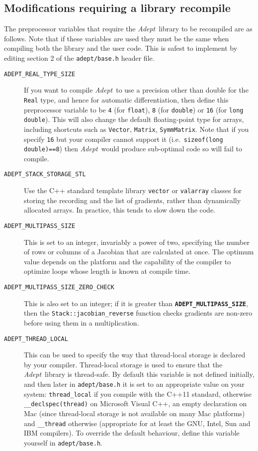 \documentclass[a4,oneside]{book}
\def\codesize{\small}
\def\Adept{\emph{Adept}}
\def\code#1{{\codesize\texttt{#1}}}
\def\codebf#1{{\codesize\texttt{\textbf{#1}}}}
\def\citem#1{\item[{\codesize\texttt{#1}}]}
\begin{document}
\subsection{Modifications requiring a library recompile}
\label{sec:configuring_lib}
\noindent The preprocessor variables that require the \Adept\ library
to be recompiled are as follows. Note that if these variables are used
they must be the same when compiling both the library and the user
code. This is safest to implement by editing section 2 of the
\code{adept/base.h} header file.
\begin{description}
\citem{ADEPT\_REAL\_TYPE\_SIZE} If you want to compile \Adept\ to use
a precision other than double for the \code{Real} type, and hence for
automatic differentiation, then define this preprocessor variable to
be \code{4} (for \code{float}), \code{8} (for \code{double}) or
\code{16} (for \code{long double}). This will also change the default
floating-point type for arrays, including shortcuts such as
\code{Vector}, \code{Matrix}, \code{SymmMatrix}. Note that if you
specify \code{16} but your compiler cannot support it
(i.e.\ \code{sizeof(long double)==8}) then \Adept\ would produce
sub-optimal code so will fail to compile.
%
\citem{ADEPT\_STACK\_STORAGE\_STL} Use the C++ standard template
library \code{vector} or \code{valarray} classes for storing the
recording and the list of gradients, rather than dynamically allocated
arrays. In practice, this tends to slow down the code.
%
\citem{ADEPT\_MULTIPASS\_SIZE} This is set to an integer, invariably a
power of two, specifying the number of rows or columns of a Jacobian
that are calculated at once. The optimum value depends on the platform
and the capability of the compiler to optimize loops whose length is
known at compile time.
% 
\citem{ADEPT\_MULTIPASS\_SIZE\_ZERO\_CHECK} This is also set to an
integer; if it is greater than \codebf{ADEPT\_MULTIPASS\_SIZE}, then
the \code{Stack::jacobian\_reverse} function checks gradients are
non-zero before using them in a multiplication.
%
\citem{ADEPT\_THREAD\_LOCAL} This can be used to specify the way that
thread-local storage is declared by your compiler.  Thread-local
storage is used to ensure that the \Adept\ library is thread-safe. By
default this variable is not defined initially, and then later in
\code{adept/base.h} it is set to an appropriate value on your system:
\code{thread\_local} if you compile with the C++11 standard, otherwise
\code{\_\_declspec(thread)} on Microsoft Visual C++, an empty
declaration on Mac (since thread-local storage is not available on
many Mac platforms) and \code{\_\_thread} otherwise (appropriate for
at least the GNU, Intel, Sun and IBM compilers). To override the
default behaviour, define this variable yourself in
\code{adept/base.h}.
\end{description}
\end{document}
